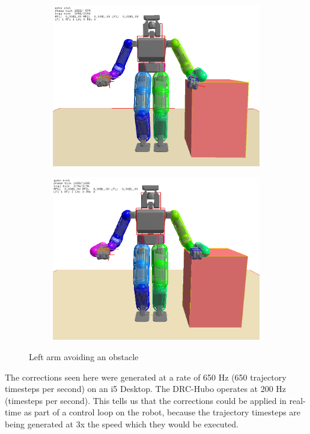 \documentclass[letterpaper, 10 pt, conference]{ieeeconf}  %
\begin{document}
\begin{figure}[h]
\begin{center}
\begin{subfigure}[h]{0.45\columnwidth}
        \includegraphics[width=\columnwidth]{pictures/mirror_5}
        \label{fig:mirror5}
    \end{subfigure}
    \begin{subfigure}[h]{0.45\columnwidth}
        \includegraphics[width=\columnwidth]{pictures/mirror_6}
        \label{fig:mirror6}
    \end{subfigure}
    \caption{Left arm avoiding an obstacle}
    \label{fig:mirror}
\end{center}
\end{figure}


The corrections seen here were generated at a rate of 650 Hz (650 trajectory timesteps per second) on an i5 Desktop. The DRC-Hubo operates at 200 Hz (timesteps per second). This tells us that the corrections could be applied in real-time as part of a control loop on the robot, because the trajectory timesteps are being generated at 3x the speed which they would be executed.
\end{document}
